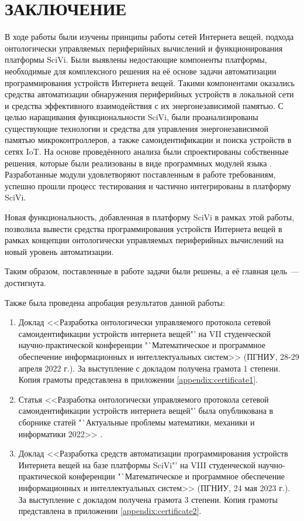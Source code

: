 \chapter*{ЗАКЛЮЧЕНИЕ}

В ходе работы были изучены принципы работы сетей Интернета вещей, подхода онтологически управляемых периферийных вычислений и функционирования платформы SciVi. Были выявлены недостающие компоненты платформы, необходимые для комплексного решения на её основе задачи автоматизации программирования устройств Интернета вещей. Такими компонентами оказались средства автоматизации обнаружения периферийных устройств в локальной сети и средства эффективного взаимодействия с их энергонезависимой памятью.
С целью наращивания функциональности SciVi, были проанализированы существующие технологии и средства для управления энергонезависимой памятью микроконтроллеров, а также самоидентификации и поиска устройств в сетях IoT.
На основе проведённого анализа были спроектированы собственные решения, которые были реализованы в виде программных модулей языка \CPP.
Разработанные модули удовлетворяют поставленным в работе требованиям, успешно прошли процесс тестирования и частично интегрированы в платформу SciVi.

Новая функциональность, добавленная в платформу SciVi в рамках этой работы, позволила вывести средства программирования устройств Интернета вещей в рамках концепции онтологически управляемых периферийных вычислений на новый уровень автоматизации.

Таким образом, поставленные в работе задачи были решены, а её главная цель~--- достигнута.

Также была проведена апробация результатов данной работы:
\begin{enumerate}
	\item Доклад <<Разработка онтологически управляемого протокола сетевой самоидентификации устройств интернета вещей"' на VII студенческой научно-практической конференции "`Математическое и программное обеспечение информационных и интеллектуальных систем>> (ПГНИУ, 28-29 апреля 2022 г.).
	За выступление с докладом получена грамота 1 степени. Копия грамоты представлена в приложении \ref{appendix:certificate1}.
	\item Статья <<Разработка онтологически управляемого протокола сетевой самоидентификации устройств интернета вещей"' была опубликована в сборнике статей "`Актуальные проблемы математики, механики и информатики 2022>> \cite{incollection:odec-self-id-protocol}.
	\item Доклад <<Разработка средств автоматизации программирования устройств Интернета вещей на базе платформы SciVi"' на VIII студенческой научно-практической конференции "`Математическое и программное обеспечение информационных и интеллектуальных систем>> (ПГНИУ, 24 мая 2023 г.).
	За выступление с докладом получена грамота 3 степени. Копия грамоты представлена в приложении \ref{appendix:certificate2}.
\end{enumerate}
